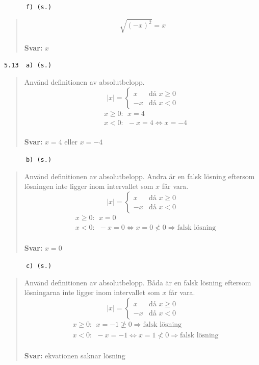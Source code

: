 \documentclass[a4paper]{article}
\newcommand{\tskcol}[1]{\textcolor{tskcol}{#1}}
\begin{document}
	\pagebreak
	\texttt{\tskcol{~~~~~~f) (s.)}}
	\begin{quotation}
		\noindent
		\[\sqrt{(-x)^2}=x\]
		\\
		\textbf{Svar:} $x$
	\end{quotation}
	
	\texttt{\tskcol{5.13~~a) (s.)}}
	\begin{quotation}
		\noindent
		Använd definitionen av absolutbelopp.
		\[|x|=
		\begin{cases}
		 x& \text{då } x \ge 0 \\
		-x& \text{då } x < 0
		\end{cases}\]
		\begin{align*}
		& x \ge 0:~~ x=4 \\
		& x < 0:~~ -x=4 \Leftrightarrow x=-4
		\end{align*}
		\\
		\textbf{Svar:} $x=4$ eller $x=-4$
	\end{quotation}
	
	\texttt{\tskcol{~~~~~~b) (s.)}}
	\begin{quotation}
		\noindent
		Använd definitionen av absolutbelopp. Andra är en falsk lösning eftersom lösningen inte ligger inom intervallet som $x$ får vara.
		\[|x|=
		\begin{cases}
		x& \text{då } x \ge 0 \\
		-x& \text{då } x < 0
		\end{cases}\]
		\begin{align*}
		& x \ge 0:~~ x=0 \\
		& x < 0:~~ -x=0 \Leftrightarrow x=0\not< 0 \Rightarrow\text{falsk lösning}
		\end{align*}
		\\
		\textbf{Svar:} $x=0$
	\end{quotation}
	
	\texttt{\tskcol{~~~~~~c) (s.)}}
	\begin{quotation}
		\noindent
		Använd definitionen av absolutbelopp. Båda är en falsk lösning eftersom lösningarna inte ligger inom intervallet som $x$ får vara.
		\[|x|=
		\begin{cases}
		x& \text{då } x \ge 0 \\
		-x& \text{då } x < 0
		\end{cases}\]
		\begin{align*}
		& x \ge 0:~~ x=-1 \not\ge 0 \Rightarrow\text{falsk lösning} \\
		& x < 0:~~ -x=-1 \Leftrightarrow x=1 \not< 0 \Rightarrow\text{falsk lösning}
		\end{align*}
		\\
		\textbf{Svar:} ekvationen saknar lösning
	\end{quotation}
	
\end{document}
